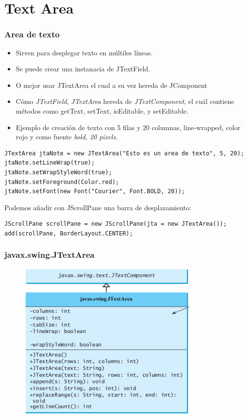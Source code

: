 \documentclass{beamer}
\begin{document}
\section{Text Area}
\begin{frame}[fragile]
\frametitle{Area de texto}
\begin{footnotesize}
\begin{itemize}[<+->]
\item Sirven para desplegar texto en múltiles líneas.
\item Se puede crear una instanacia de \alert{JTextField}.
\item O mejor usar \alert{JTextArea} el cual a su vez hereda de \alert{JComponent}
\item Cómo \emph{JTextField}, \emph{JTextArea} hereda de \emph{JTextComponent}, el cuál contiene métodos como \alert{getText, setText, isEditable, y setEditable.}
\item Ejemplo de creación de texto con 5 filas y 20 columnas, line-wrapped, color rojo y como fuente \emph{bold, 20 pixels.}
\end{itemize}
\pause
\begin{verbatim}
JTextArea jtaNote = new JTextArea("Esto es un area de texto", 5, 20);
jtaNote.setLineWrap(true);
jtaNote.setWrapStyleWord(true);
jtaNote.setForeground(Color.red);
jtaNote.setFont(new Font("Courier", Font.BOLD, 20));
\end{verbatim}
\pause 
Podemos añadir con \alert{JScrollPane } una barra de desplazamiento:
\begin{verbatim}
JScrollPane scrollPane = new JScrollPane(jta = new JTextArea());
add(scrollPane, BorderLayout.CENTER);
\end{verbatim}
\end{footnotesize}
\end{frame}

\begin{frame}
\frametitle{javax.swing.JTextArea} 
\begin{figure}
\includegraphics[scale=0.7]{imagenes/area.png} 
\end{figure} 
\end{frame}
\end{document}
